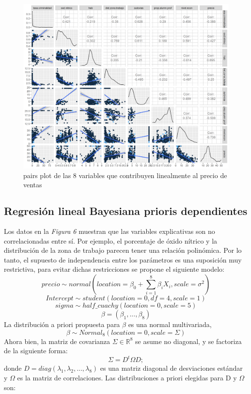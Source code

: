 \documentclass[nojss]{jss}
\begin{document}
\begin{figure}[H]
	\centering
	\includegraphics[scale=1]{images/pairs3-1}
	\caption[pairs]{pairs plot de las 8 variables que contribuyen linealmente al precio de ventas}
	\label{fig:fig6}
\end{figure}

\subsection{Regresi\'on lineal Bayesiana prioris dependientes}

Los datos en la \textit{Figura 6} muestran que las variables explicativas son no correlacionadas entre sí. Por ejemplo, el porcentaje de óxido nítrico y la distribución de la zona de trabajo parecen tener una relación polinómica. Por lo tanto, el supuesto de independencia entre los parámetros es una suposición muy restrictiva, para evitar dichas restricciones se propone el siguiente modelo:
$$ precio \sim normal(location = \beta_0+ \sum_{i=1}^{8}\beta_i X_i,scale =  \sigma^2)$$
$$Intercept \sim student(location = 0,df = 4,scale =1)$$
$$sigma \sim half\_cuachy(location = 0,scale =5)$$
$$\beta = (\beta_1,...,\beta_{8})$$ 
La distribución a priori propuesta para $\beta$ es una normal multivariada,
$$\beta \sim Normal_8(location = 0,scale = \Sigma)$$
Ahora bien, la matriz de covarianza $\Sigma \in \mathbb{R}^{8}$ se asume no diagonal, y se factoriza de la siguiente forma:
$$\Sigma = D^t\Omega D;$$
donde  $D = diag(\lambda_1,\lambda_2,...,\lambda_{8})$ es una matriz diagonal de desviaciones estándar y $\Omega$ es la matriz de correlaciones. Las distribuciones a  priori elegidas para D y $\Omega$ son:
\end{document}
